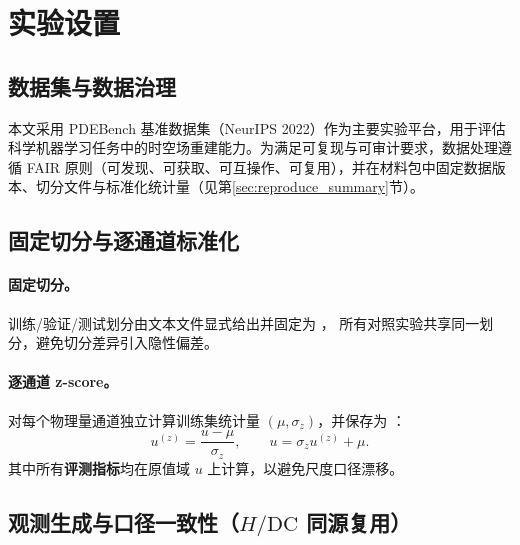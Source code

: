 
\section{实验设置}\label{sec:exp_setup}

\subsection{数据集与数据治理}\label{sec:dataset}

本文采用 PDEBench 基准数据集（NeurIPS 2022）作为主要实验平台，用于评估科学机器学习任务中的时空场重建能力\cite{takamoto2022pdebench}。为满足可复现与可审计要求，数据处理遵循 FAIR 原则（可发现、可获取、可互操作、可复用）\cite{wilkinson2016fair}，并在材料包中固定数据版本、切分文件与标准化统计量（见第\ref{sec:reproduce_summary}节）。

\subsection{固定切分与逐通道标准化}\label{sec:splits_norm}

\paragraph{固定切分。}
训练/验证/测试划分由文本文件显式给出并固定为
，
所有对照实验共享同一划分，避免切分差异引入隐性偏差。

\paragraph{逐通道 z-score。}
对每个物理量通道独立计算训练集统计量 $(\mu,\sigma_z)$，并保存为 ：
\begin{equation}
u^{(z)} = \frac{u-\mu}{\sigma_z},\qquad
u = \sigma_z u^{(z)} + \mu.
\label{eq:ch6_zscore}
\end{equation}
其中所有\textbf{评测指标}均在原值域 $u$ 上计算，以避免尺度口径漂移。

\subsection{观测生成与口径一致性（\texorpdfstring{$H/\mathrm{DC}$}{H/DC} 同源复用）}\label{sec:obs_hdc}

